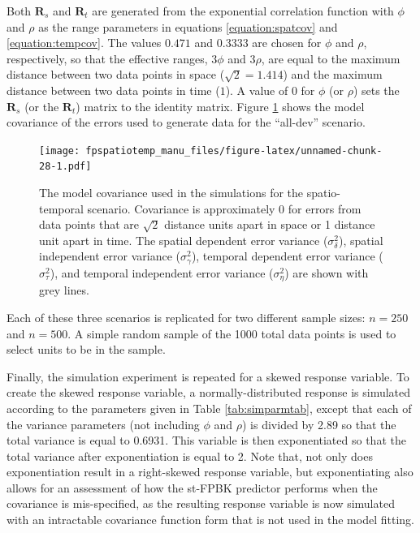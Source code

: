 \documentclass[]{interact}
\theoremstyle{plain}%
\theoremstyle{definition}
\theoremstyle{remark}
\begin{document}
Both \(\mathbf{R}_{s}\) and \(\mathbf{R}_t\) are generated from the
exponential correlation function with \(\phi\) and \(\rho\) as the range
parameters in equations \ref{equation:spatcov} and
\ref{equation:tempcov}. The values \(0.471\) and \(0.3333\) are chosen
for \(\phi\) and \(\rho\), respectively, so that the effective ranges,
\(3 \phi\) and \(3 \rho\), are equal to the maximum distance between two
data points in space (\(\sqrt2 = 1.414\)) and the maximum distance
between two data points in time (\(1\)). A value of 0 for \(\phi\) (or
\(\rho\)) sets the \(\mathbf{R}_{s}\) (or the \(\mathbf{R}_t\)) matrix
to the identity matrix. Figure \ref{fig:simcovplot} shows the model
covariance of the errors used to generate data for the ``all-dev''
scenario.

\begin{figure}
\centering
\texttt{[image: fpspatiotemp\_manu\_files/figure-latex/unnamed-chunk-28-1.pdf]}
\caption{\label{fig:simcovplot} The model covariance used in the
simulations for the spatio-temporal scenario. Covariance is
approximately 0 for errors from data points that are \(\sqrt2\) distance
units apart in space or 1 distance unit apart in time. The spatial
dependent error variance (\(\sigma^2_{\delta}\)), spatial independent
error variance (\(\sigma^2_{\gamma}\)), temporal dependent error
variance (\(\sigma^2_{\tau}\)), and temporal independent error variance
(\(\sigma^2_{\eta}\)) are shown with grey lines.}
\end{figure}

Each of these three scenarios is replicated for two different sample
sizes: \(n = 250\) and \(n = 500\). A simple random sample of the 1000
total data points is used to select units to be in the sample.

Finally, the simulation experiment is repeated for a skewed response
variable. To create the skewed response variable, a normally-distributed
response is simulated according to the parameters given in Table
\ref{tab:simparmtab}, except that each of the variance parameters (not
including \(\phi\) and \(\rho\)) is divided by 2.89 so that the total
variance is equal to 0.6931. This variable is then exponentiated so that
the total variance after exponentiation is equal to 2. Note that, not
only does exponentiation result in a right-skewed response variable, but
exponentiating also allows for an assessment of how the st-FPBK
predictor performs when the covariance is mis-specified, as the
resulting response variable is now simulated with an intractable
covariance function form that is not used in the model fitting.
\end{document}
